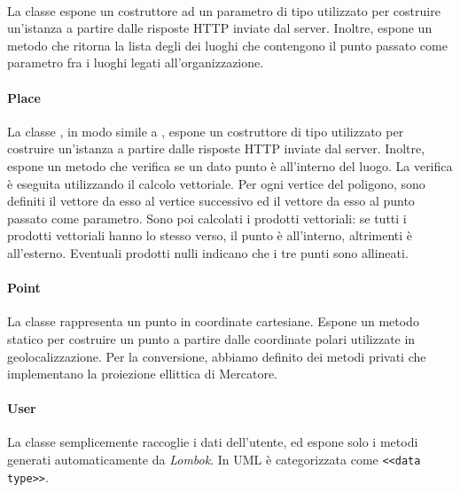 \documentclass[../../manuale-manutentore.tex]{subfiles}
\begin{document}
\paragraph[Organization]{}%
\label{par:app/organization}

La classe  espone un costruttore ad un parametro di tipo  utilizzato per costruire un'istanza a partire dalle risposte HTTP inviate dal server.
Inoltre, espone un metodo  che ritorna la lista degli  dei luoghi che contengono il punto passato come parametro fra i luoghi legati all'organizzazione.

\paragraph[Place]{Place}%
\label{par:place}

La classe , in modo simile a , espone un costruttore di tipo  utilizzato per costruire un'istanza a partire dalle risposte HTTP inviate dal server.
Inoltre, espone un metodo  che verifica se un dato punto è all'interno del luogo.
La verifica è eseguita utilizzando il calcolo vettoriale.
Per ogni vertice del poligono, sono definiti il vettore da esso al vertice successivo ed il vettore da esso al punto passato come parametro.
Sono poi calcolati i prodotti vettoriali: se tutti i prodotti vettoriali hanno lo stesso verso, il punto è all'interno, altrimenti è all'esterno.
Eventuali prodotti nulli indicano che i tre punti sono allineati.

\paragraph[Point]{Point}%
\label{par:point}

La classe  rappresenta un punto in coordinate cartesiane.
Espone un metodo statico \linebreak{} per costruire un punto a partire dalle coordinate polari utilizzate in geolocalizzazione.
Per la conversione, abbiamo definito dei metodi privati che implementano la proiezione ellittica di Mercatore.

\paragraph[User]{User}%
\label{par:app/user}

La classe  semplicemente raccoglie i dati dell'utente, ed espone solo i metodi generati automaticamente da \textit{Lombok}.
In UML è categorizzata come \texttt{<<data type>>}.
\end{document}
